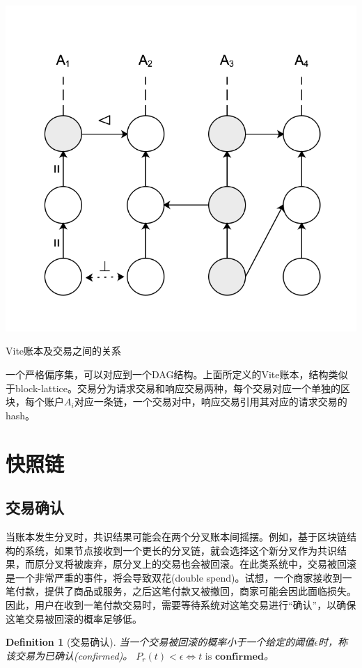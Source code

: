 \documentclass[UTF8,nofonts]{ctexart}
\makeatletter
\newtheorem{definition}{Definition}[section]
\newenvironment{figurehere}
 {\def\@captype{figure}}
 {}
\makeatother
\begin{document}
\begin{multicols}{2}
\begin{center}
\begin{figurehere}
\includegraphics[width=.7\linewidth]{image/ledger.png}
\caption{Vite账本及交易之间的关系}
\end{figurehere}
\end{center}

一个严格偏序集，可以对应到一个DAG结构。上面所定义的Vite账本，结构类似于block-lattice。交易分为请求交易和响应交易两种，每个交易对应一个单独的区块，每个账户$A_{i}$对应一条链，一个交易对中，响应交易引用其对应的请求交易的hash。

\section{快照链}
\subsection{交易确认}
当账本发生分叉时，共识结果可能会在两个分叉账本间摇摆。例如，基于区块链结构的系统，如果节点接收到一个更长的分叉链，就会选择这个新分叉作为共识结果，而原分叉将被废弃，原分叉上的交易也会被回滚。在此类系统中，交易被回滚是一个非常严重的事件，将会导致双花(double spend)。试想，一个商家接收到一笔付款，提供了商品或服务，之后这笔付款又被撤回，商家可能会因此面临损失。因此，用户在收到一笔付款交易时，需要等待系统对这笔交易进行“确认”，以确保这笔交易被回滚的概率足够低。

\begin{definition}[交易确认]
当一个交易被回滚的概率小于一个给定的阈值$\epsilon$时，称该交易为已确认(confirmed)。
$P_{r}(t) < \epsilon \Leftrightarrow t \text{ is } \boldsymbol{confirmed}$。
\end{definition}


\end{multicols}
\end{document}
